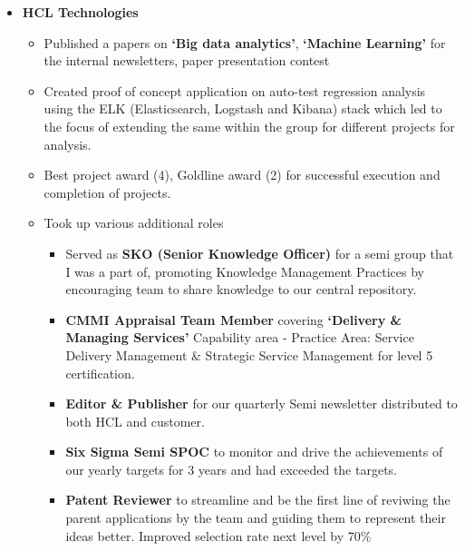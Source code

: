 \documentclass[a4paper,12pt]{article}
\begin{document}
\begin{itemize}
  \item{\bf{HCL Technologies}}
    
    \begin{itemize}
      \setlength\itemsep{-0.5em}

    \item Published a papers on \textbf{`Big data analytics'},
      \textbf{`Machine Learning'} for the internal newsletters, paper
      presentation contest

    \item Created proof of concept application on auto-test
      regression analysis using the ELK (Elasticsearch, Logstash and
      Kibana) stack which led to the focus of extending the same
      within the group for different projects for analysis.

    \item Best project award (4), Goldline award (2) for successful
      execution and completion of projects.
      
    \item Took up various additional roles
      \begin{itemize}
      \setlength\itemsep{-0.5em}
        
      \item Served as \textbf{SKO (Senior Knowledge Officer)} for a
        semi group that I was a part of, promoting Knowledge
        Management Practices by encouraging team to share knowledge to
        our central repository.

      \item \textbf{CMMI Appraisal Team Member} covering
        \textbf{`Delivery \& Managing Services'} Capability area -
        Practice Area: Service Delivery Management \& Strategic
        Service Management for level 5 certification.

      \item \textbf{Editor \& Publisher} for our quarterly Semi
        newsletter distributed to both HCL and customer.
        
      \item \textbf{Six Sigma Semi SPOC} to monitor and drive the
        achievements of our yearly targets for 3 years and had
        exceeded the targets.

      \item \textbf{Patent Reviewer} to streamline and be the first
        line of reviwing the parent applications by the team and
        guiding them to represent their ideas better. Improved
        selection rate next level by 70\%


\end{itemize}
\end{itemize}
\end{itemize}
\end{document}
